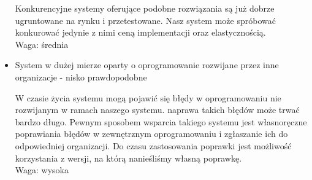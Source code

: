 \documentclass[../wstep.tex]{subfiles}
\begin{document}
\begin{itemize}
          Konkurencyjne systemy oferujące podobne rozwiązania są już dobrze ugruntowane na rynku i przetestowane. Nasz system może spróbować konkurować jedynie z nimi ceną implementacji oraz elastycznością.\\
          Waga: średnia
    \item System w dużej mierze oparty o oprogramowanie rozwijane przez inne organizacje - nisko prawdopodobne

          W czasie życia systemu mogą pojawić się błędy w oprogramowaniu nie rozwijanym w ramach naszego systemu. naprawa takich błędów może trwać bardzo długo. Pewnym sposobem wsparcia takiego systemu jest własnoręczne poprawiania błędów w zewnętrznym oprogramowaniu i zgłaszanie ich do odpowiedniej organizacji. Do czasu zastosowania poprawki jest możliwość korzystania z wersji, na którą nanieśliśmy własną poprawkę.\\
          Waga: wysoka

\end{itemize}
\end{document}
